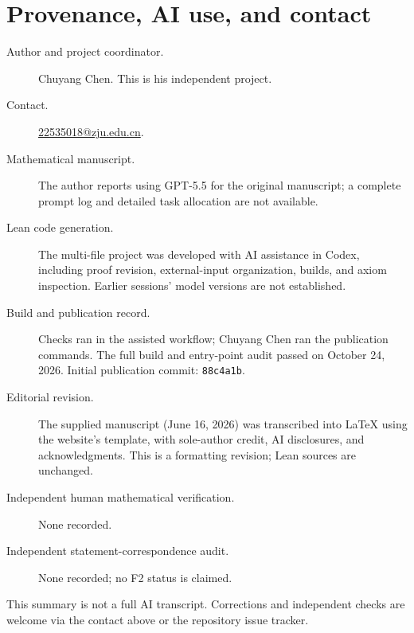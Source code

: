 \documentclass[11pt]{article}
\theoremstyle{remark}
\begin{document}
\section*{Provenance, AI use, and contact}
\begingroup\small\sloppy
\begin{description}
\item[Author and project coordinator.] Chuyang Chen. This is his independent project.
\item[Contact.] \href{mailto:22535018@zju.edu.cn}{22535018@zju.edu.cn}.
\item[Mathematical manuscript.] The author reports using GPT-5.5 for the original manuscript; a complete prompt log and detailed task allocation are not available.
\item[Lean code generation.] The multi-file project was developed with AI assistance in Codex, including proof revision, external-input organization, builds, and axiom inspection. Earlier sessions' model versions are not established.
\item[Build and publication record.] Checks ran in the assisted workflow; Chuyang Chen ran the publication commands. The full build and entry-point audit passed on October 24, 2026. Initial publication commit: \texttt{88c4a1b}.
\item[Editorial revision.] The supplied manuscript (June 16, 2026) was transcribed into LaTeX using the website's template, with sole-author credit, AI disclosures, and acknowledgments. This is a formatting revision; Lean sources are unchanged.
\item[Independent human mathematical verification.] None recorded.
\item[Independent statement-correspondence audit.] None recorded; no F2 status is claimed.
\end{description}
\noindent This summary is not a full AI transcript. Corrections and independent checks are welcome via the contact above or the repository issue tracker.
\endgroup
\end{document}
